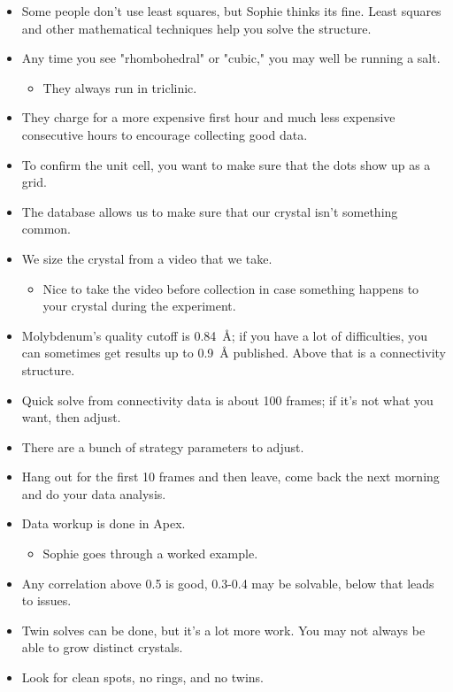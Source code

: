 \documentclass[../notes.tex]{subfiles}
\begin{document}
\begin{itemize}
    \item Some people don't use least squares, but Sophie thinks its fine. Least squares and other mathematical techniques help you solve the structure.
    \item Any time you see "rhombohedral" or "cubic," you may well be running a salt.
    \begin{itemize}
        \item They always run in triclinic.
    \end{itemize}
    \item They charge for a more expensive first hour and much less expensive consecutive hours to encourage collecting good data.
    \item To confirm the unit cell, you want to make sure that the dots show up as a grid.
    \item The database allows us to make sure that our crystal isn't something common.
    \item We size the crystal from a video that we take.
    \begin{itemize}
        \item Nice to take the video before collection in case something happens to your crystal during the experiment.
    \end{itemize}
    \item Molybdenum's quality cutoff is \SI{0.84}{\angstrom}; if you have a lot of difficulties, you can sometimes get results up to \SI{0.9}{\angstrom} published. Above that is a connectivity structure.
    \item Quick solve from connectivity data is about 100 frames; if it's not what you want, then adjust.
    \item There are a bunch of strategy parameters to adjust.
    \item Hang out for the first 10 frames and then leave, come back the next morning and do your data analysis.
    \item Data workup is done in Apex.
    \begin{itemize}
        \item Sophie goes through a worked example.
    \end{itemize}
    \item Any correlation above 0.5 is good, 0.3-0.4 may be solvable, below that leads to issues.
    \item Twin solves can be done, but it's a lot more work. You may not always be able to grow distinct crystals.
    \item Look for clean spots, no rings, and no twins.

\end{itemize}
\end{document}
